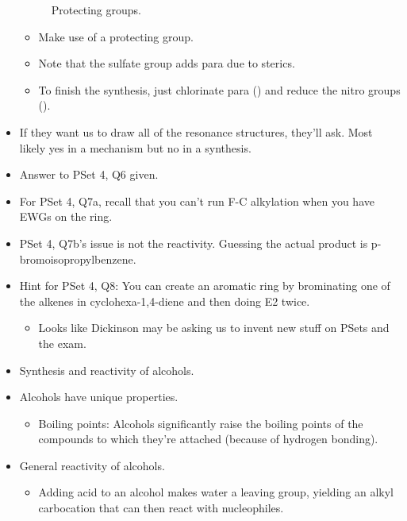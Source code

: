 \documentclass[../notes.tex]{subfiles}
\begin{document}
\begin{itemize}
\begin{figure}[h!]
        \schemestop
        \caption{Protecting groups.}
        \label{fig:protectingGroup}
    \end{figure}
    \begin{itemize}
        \item Make use of a protecting group.\par
        \item Note that the sulfate group adds para due to sterics.
        \item To finish the synthesis, just chlorinate para () and reduce the nitro groups ().
    \end{itemize}
    \item If they want us to draw all of the resonance structures, they'll ask. Most likely yes in a mechanism but no in a synthesis.
    \item Answer to PSet 4, Q6 given.
    \item For PSet 4, Q7a, recall that you can't run F-C alkylation when you have EWGs on the ring.
    \item PSet 4, Q7b's issue is not the reactivity. Guessing the actual product is p-bromoisopropylbenzene.
    \item Hint for PSet 4, Q8: You can create an aromatic ring by brominating one of the alkenes in cyclohexa-1,4-diene and then doing E2 twice.
    \begin{itemize}
        \item Looks like Dickinson may be asking us to invent new stuff on PSets and the exam.
    \end{itemize}
    \item Synthesis and reactivity of alcohols.
    \item Alcohols have unique properties.
    \begin{itemize}
        \item Boiling points: Alcohols significantly raise the boiling points of the compounds to which they're attached (because of hydrogen bonding).
    \end{itemize}
    \item General reactivity of alcohols.
    \begin{itemize}
        \item Adding acid to an alcohol makes water a leaving group, yielding an alkyl carbocation that can then react with nucleophiles.

\end{itemize}
\end{itemize}
\end{document}
